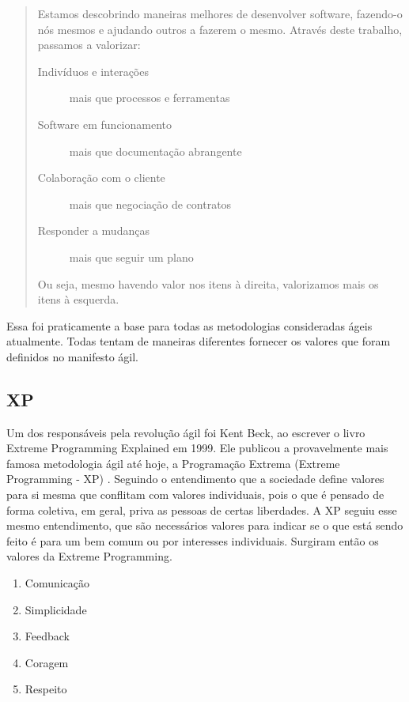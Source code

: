 \documentclass[
	article,			%
	11pt,				%
	oneside,			%
	a4paper,			%
	english,			%
	brazil,				%
	sumario=tradicional
	]{abntex2}
\begin{document}
\begin{quotation}
   Estamos descobrindo maneiras melhores de desenvolver software, fazendo-o nós
   mesmos e ajudando outros a fazerem o mesmo. Através deste trabalho, passamos
   a valorizar:
   
   \begin{description}
      \item[Indivíduos e interações] mais que processos e ferramentas
      \item[Software em funcionamento] mais que documentação abrangente
      \item[Colaboração com o cliente] mais que negociação de contratos
      \item[Responder a mudanças] mais que seguir um plano
   \end{description}
   
   Ou seja, mesmo havendo valor nos itens à direita, valorizamos mais os itens
   à esquerda.
\end{quotation}

Essa foi praticamente a base para todas as metodologias consideradas ágeis
atualmente. Todas tentam de maneiras diferentes fornecer os valores que foram
definidos no manifesto ágil.

\subsection{XP}

Um dos responsáveis pela revolução ágil foi Kent Beck, ao escrever o livro
Extreme Programming Explained em 1999. Ele publicou a provavelmente mais famosa
metodologia ágil até hoje, a Programação Extrema (Extreme Programming - XP)
\cite{Beck:1999:ECE:619045.621348}. Seguindo o entendimento que a sociedade
define valores para si mesma que conflitam com valores individuais, pois o que é
pensado de forma coletiva, em geral, priva as pessoas de certas liberdades. A XP
seguiu esse mesmo entendimento, que são necessários valores para indicar se o
que está sendo feito é para um bem comum ou por interesses individuais. Surgiram
então os valores da Extreme Programming.


\begin{enumerate}
   \item Comunicação
   \item Simplicidade
   \item Feedback
   \item Coragem
   \item Respeito
\end{enumerate}
\end{document}
